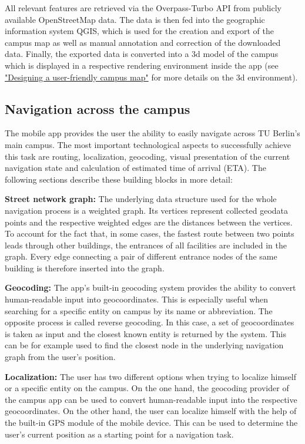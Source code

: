 All relevant features are retrieved via the Overpass-Turbo API from publicly available OpenStreetMap data. The data is then fed into the geographic information system QGIS, which is used for the creation and export of the campus map as well as manual annotation and correction of the downloaded data. Finally, the exported data is converted into a 3d model of the campus which is displayed in a respective rendering environment inside the app (see \hyperref[sub:campus_user_experience]{"Designing a user-friendly campus map"} for more details on the 3d environment).

\subsection{Navigation across the campus}
The mobile app provides the user the ability to easily navigate across TU Berlin's main campus. The most important technological aspects to successfully achieve this task are routing, localization, geocoding, visual presentation of the current navigation state and calculation of estimated time of arrival (ETA). The following sections describe these building blocks in more detail:

\textbf{Street network graph:} The underlying data structure used for the whole navigation process is a weighted graph. Its vertices represent collected geodata points and the respective weighted edges are the distances between the vertices. To account for the fact that, in some cases, the fastest route between two points leads through other buildings, the entrances of all facilities are included in the graph. Every edge connecting a pair of different entrance nodes of the same building is therefore inserted into the graph.

\textbf{Geocoding:} The app's built-in geocoding system provides the ability to convert human-readable input into geocoordinates. This is especially useful when searching for a specific entity on campus by its name or abbreviation. The opposite process is called reverse geocoding. In this case, a set of geocoordinates is taken as input and the closest known entity is returned by the system. This can be for example used to find the closest node in the underlying navigation graph from the user's position.

\textbf{Localization:} The user has two different options when trying to localize himself or a specific entity on the campus. On the one hand, the geocoding provider of the campus app can be used to convert human-readable input into the respective geocoordinates. On the other hand, the user can localize himself with the help of the built-in GPS module of the mobile device. This can be used to determine the user's current position as a starting point for a navigation task.

